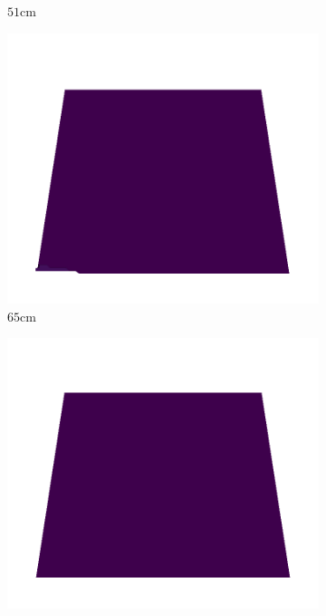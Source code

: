\documentclass[../document.tex]{subfiles}
\begin{document}
\begin{figure}[H]
\begin{subfigure}[b]{0.19\textwidth}
    \caption{$51$cm}
    \end{subfigure}
    \begin{subfigure}[b]{0.19\textwidth}
    \includegraphics[width=\linewidth]{../img/5/quarry/all/best/65-patch-3d-majavi-colormap-6.png}
    \caption{$65$cm}
    \end{subfigure}
    \begin{subfigure}[b]{0.19\textwidth}
    \includegraphics[width=\linewidth]{../img/5/quarry/all/best/67-patch-3d-majavi-colormap-7.png}

\end{subfigure}
\end{figure}
\end{document}
